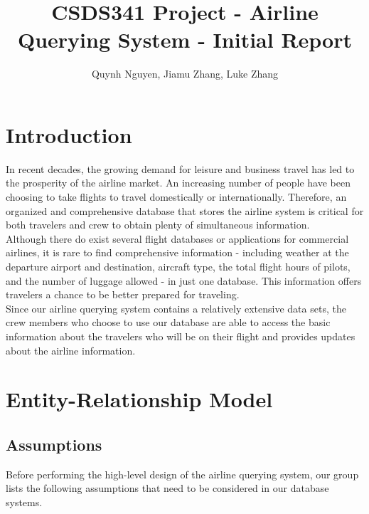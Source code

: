 \documentclass{article}
\title{CSDS341 Project - Airline Querying System - Initial Report}
\author{Quynh Nguyen, Jiamu Zhang, Luke Zhang}
\begin{document}
	
	
	\maketitle
	
	\section{Introduction}
	
	\noindent In recent decades, the growing demand for leisure and business travel has led to the prosperity of the airline market. An increasing number of people have been choosing to take flights to travel domestically or internationally. Therefore, an organized and comprehensive database that stores the airline system is critical for both travelers and crew to obtain plenty of simultaneous information.\\
	
	\noindent Although there do exist several flight databases or applications for commercial airlines, it is rare to find comprehensive information - including weather at the departure airport and destination, aircraft type, the total flight hours of pilots, and the number of luggage allowed - in just one database. This information offers travelers a chance to be better prepared for traveling.\\
	
	\noindent Since our airline querying system contains a relatively extensive data sets, the crew members who choose to use our database are able to access the basic information about the travelers who will be on their flight and provides updates about the airline information. 
	
	\section{Entity-Relationship Model}
	
	\subsection{Assumptions}
	{Before performing the high-level design of the airline querying system, our group lists the following assumptions that need to be considered in our database systems.}
	
\end{document}
